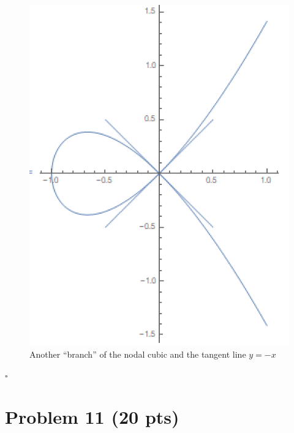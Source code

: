 \documentclass[12pt]{article}
\begin{document}
\begin{figure}[!htb]
	\centering
	\includegraphics[scale=0.6]{ag5}
	\caption{Another ``branch'' of the nodal cubic and the tangent line $y=-x$}
\end{figure}



\hfill $\square$


\newpage


\section*{Problem 11 \small{(20 pts)}}
\end{document}
